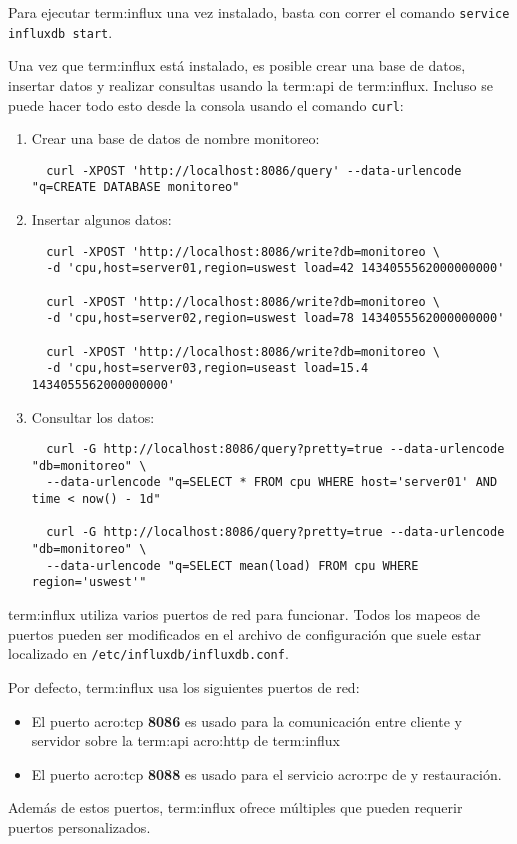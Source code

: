 Para ejecutar \gls{term:influx} una vez instalado, basta con correr el comando
\lstinline{service influxdb start}.

Una vez que \gls{term:influx} está instalado, es posible crear una base de
datos, insertar datos y realizar consultas usando la \gls{term:api} de
\gls{term:influx}. Incluso se puede hacer todo esto desde la consola usando el
comando \lstinline{curl}:

\begin{enumerate}
  \item{Crear una base de datos de nombre monitoreo:}
  \begin{lstlisting}
  curl -XPOST 'http://localhost:8086/query' --data-urlencode "q=CREATE DATABASE monitoreo"
  \end{lstlisting}

  \item{Insertar algunos datos:}
  \begin{lstlisting}
  curl -XPOST 'http://localhost:8086/write?db=monitoreo \
  -d 'cpu,host=server01,region=uswest load=42 1434055562000000000'

  curl -XPOST 'http://localhost:8086/write?db=monitoreo \
  -d 'cpu,host=server02,region=uswest load=78 1434055562000000000'

  curl -XPOST 'http://localhost:8086/write?db=monitoreo \
  -d 'cpu,host=server03,region=useast load=15.4 1434055562000000000'
  \end{lstlisting}


  \item{Consultar los datos:}
  \begin{lstlisting}
  curl -G http://localhost:8086/query?pretty=true --data-urlencode "db=monitoreo" \
  --data-urlencode "q=SELECT * FROM cpu WHERE host='server01' AND time < now() - 1d"

  curl -G http://localhost:8086/query?pretty=true --data-urlencode "db=monitoreo" \
  --data-urlencode "q=SELECT mean(load) FROM cpu WHERE region='uswest'"
  \end{lstlisting}
\end{enumerate}

\gls{term:influx} utiliza varios puertos de red para funcionar. Todos los
mapeos de puertos pueden ser modificados en el archivo de configuración que
suele estar localizado en \texttt{/etc/influxdb/influxdb.conf}.

Por defecto, \gls{term:influx} usa los siguientes puertos de red:

\begin{itemize}

  \item
  El puerto \gls{acro:tcp} \textbf{8086} es usado para la comunicación entre cliente y
  servidor sobre la \gls{term:api} \gls{acro:http} de \gls{term:influx}

  \item
    El puerto \gls{acro:tcp} \textbf{8088} es usado para el servicio \gls{acro:rpc} de  y
  restauración.

\end{itemize}

Además de estos puertos, \gls{term:influx} ofrece múltiples \eng{plugins} que pueden
requerir puertos personalizados.
